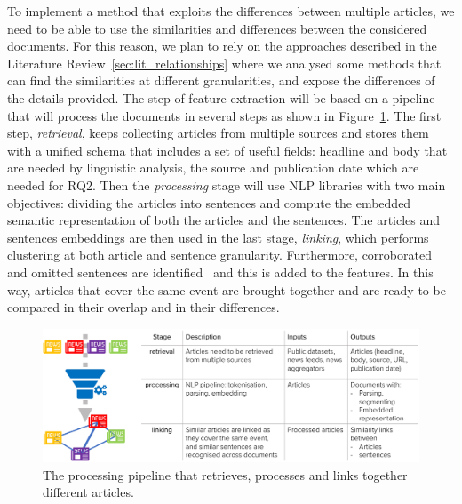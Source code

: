 To implement a method that exploits the differences between multiple articles, we need to be able to use the similarities and differences between the considered documents.
For this reason, we plan to rely on the approaches described in the Literature Review~\ref{sec:lit_relationships} where we analysed some methods that can find the similarities at different granularities, and expose the differences of the details provided.
The step of feature extraction will be based on a pipeline that will process the documents in several steps as shown in Figure~\ref{fig:pipeline}.
The first step, \emph{retrieval}, keeps collecting articles from multiple sources and stores them with a unified schema that includes a set of useful fields: headline and body that are needed by linguistic analysis, the source and publication date which are needed for RQ2.
Then the \emph{processing} stage will use NLP libraries with two main objectives: dividing the articles into sentences and compute the embedded semantic representation of both the articles and the sentences.
The articles and sentences embeddings are then used in the last stage, \emph{linking}, which performs clustering at both article and sentence granularity. Furthermore, corroborated and omitted sentences are identified~\cite{bountouridis2018explaining} and this is added to the features.
In this way, articles that cover the same event are brought together and are ready to be compared in their overlap and in their differences.

\begin{figure}[!htb]
    \centering
    \includegraphics[width=\textwidth]{figures/figure_pipeline.pdf}
    \caption{The processing pipeline that retrieves, processes and links together different articles.}
    \label{fig:pipeline}
\end{figure}

